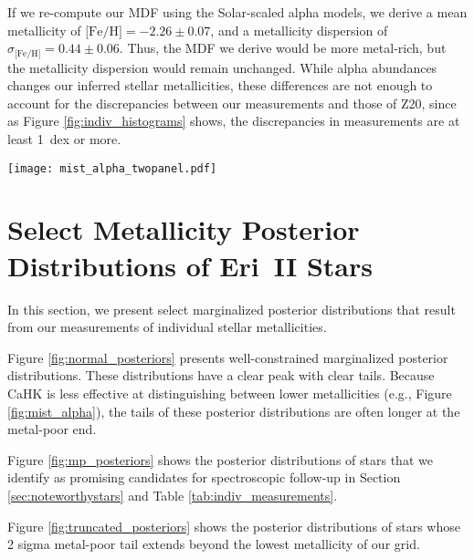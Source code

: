 \documentclass[twocolumn]{aastex63}
\begin{document}
\par If we re-compute our MDF using the Solar-scaled alpha models, we derive a mean metallicity of $\mbox{[Fe/H]}=-2.26\pm0.07$, and a metallicity dispersion of $\sigma_{\mbox{[Fe/H]}}=0.44\pm0.06$. Thus, the MDF we derive would be more metal-rich, but the metallicity dispersion would remain unchanged. While alpha abundances changes our inferred stellar metallicities, these differences are not enough to account for the discrepancies between our measurements and those of Z20, since as Figure \ref{fig:indiv_histograms} shows, the discrepancies in measurements are at least 1~dex or more. 

\begin{figure*}
    \centering
    \texttt{[image: mist\_alpha\_twopanel.pdf]}
    \caption{Comparing MIST isochrones in CaHK color space for isochrone models with [$\alpha$/Fe]$=0.0$ (left panel) vs [$\alpha$/Fe]$=+0.40$ (right panel). For an isochrone of a given metallicity, the $\alpha$-enhanced model reaches redder extents in $F475W-F814W$, and is also redder in CaHK color index.}
    \label{fig:mist_alpha}
\end{figure*}

\section{Select Metallicity Posterior Distributions of Eri~II Stars}
\label{sec:appendix_posteriordistrs}

\par In this section, we present select marginalized posterior distributions that result from our measurements of individual stellar metallicities. 

\par Figure \ref{fig:normal_posteriors} presents well-constrained marginalized posterior distributions. These distributions have a clear peak with clear tails. Because CaHK is less effective at distinguishing between lower metallicities (e.g., Figure \ref{fig:mist_alpha}), the tails of these posterior distributions are often longer at the metal-poor end. 

\par Figure \ref{fig:mp_posteriors} shows the posterior distributions of stars that we identify as promising candidates for spectroscopic follow-up in Section \ref{sec:noteworthystars} and Table \ref{tab:indiv_measurements}. 

\par Figure \ref{fig:truncated_posteriors} shows the posterior distributions of stars whose 2 sigma metal-poor tail extends beyond the lowest metallicity of our grid. 
\end{document}
